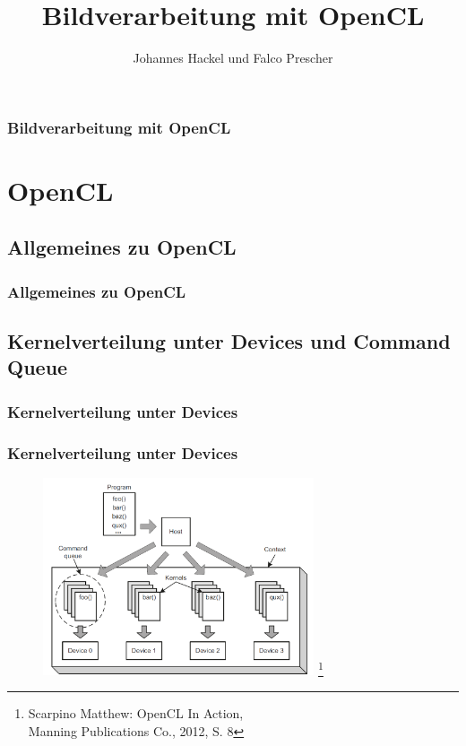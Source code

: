 \documentclass{beamer}
\author{Johannes Hackel und Falco Prescher}
\title{Bildverarbeitung mit OpenCL}
\begin{document}
\begin{frame}
\titlepage
\end{frame}

\begin{frame}
\frametitle{Bildverarbeitung mit OpenCL}
\tableofcontents
\end{frame}

\section{OpenCL}

\subsection{Allgemeines zu OpenCL}
\begin{frame}
\frametitle{Allgemeines zu OpenCL}
\end{frame}

\subsection{Kernelverteilung unter Devices und Command Queue}

\subsubsection*{Kernelverteilung unter Devices}
\begin{frame}
\frametitle{Kernelverteilung unter Devices}
\begin{figure}
\begin{center}
\includegraphics[width=8cm]{kernel_distr_manning_p8.PNG}
\footnote{\tiny{Scarpino Matthew: OpenCL In Action, \\Manning Publications Co., 2012, S. 8}}
\end{center}
\end{figure}
\end{frame}
\end{document}
